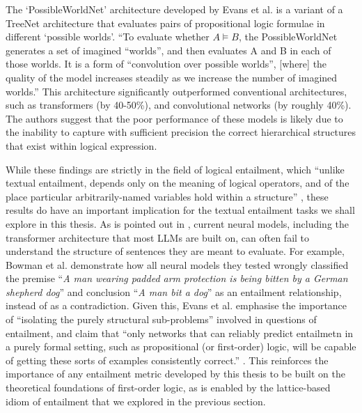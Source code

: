 \documentclass[12pt,twoside]{report}
\begin{document}
The `PossibleWorldNet' architecture developed by Evans et al. is a variant of a TreeNet architecture that evaluates pairs of propositional logic formulae in different `possible worlds'. ``To evaluate whether $A \models B$, the PossibleWorldNet generates a set of imagined “worlds”, and then evaluates A and B in each of those worlds. It is a form of ``convolution over possible worlds'', [where] the quality of the model increases steadily as we increase the number of imagined worlds.'' \cite{Evans2018} This architecture significantly outperformed conventional architectures, such as transformers (by 40-50\%), and convolutional networks (by roughly 40\%). The authors suggest that the poor performance of these models is likely due to the inability to capture with sufficient precision the correct hierarchical structures that exist within logical expression. \newline \par

While these findings are strictly in the field of logical entailment, which ``unlike textual entailment, depends only on the meaning of logical operators, and of the place particular arbitrarily-named variables hold within a structure'' \cite{Evans2018}, these results do have an important implication for the textual entailment tasks we shall explore in this thesis. As is pointed out in \cite{Evans2018}, current neural models, including the transformer architecture that most LLMs are built on, can often fail to understand the structure of sentences they are meant to evaluate. For example, Bowman et al. \cite{bowman2015} demonstrate how all neural models they tested wrongly classified the premise ``\textit{A man wearing padded arm protection is being bitten by a German shepherd dog}'' and conclusion ``\textit{A man bit a dog}'' as an entailment relationship, instead of as a contradiction. Given this, Evans et al. emphasise the importance of ``isolating the purely structural sub-problems'' involved in questions of entailment, and claim that ``only networks that can reliably predict entailmetn in a purely formal setting, such as propositional (or first-order) logic, will be capable of getting these sorts of examples consistently correct.'' \cite{Evans2018}. This reinforces the importance of any entailment metric developed by this thesis to be built on the theoretical foundations of first-order logic, as is enabled by the lattice-based idiom of entailment that we explored in the previous section. \newline \par
\end{document}

